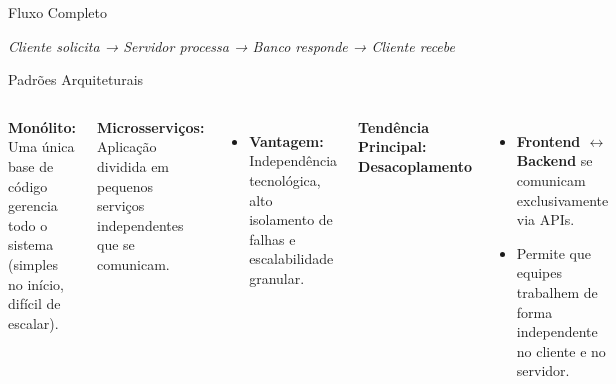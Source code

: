 \documentclass{beamer}
\begin{document}
\begin{frame}{Fluxo Completo}

\begin{center}


\end{center}

\vspace{0.2cm}
\textit{Cliente solicita → Servidor processa → Banco responde → Cliente recebe}

\end{frame}


\begin{frame}{Padrões Arquiteturais}
    \begin{columns}[t]
        \textbf{Monólito:} Uma única base de código gerencia todo o sistema (simples no início, difícil de escalar).
        
        \vspace{0.3cm}
        \textbf{Microsserviços:} Aplicação dividida em pequenos serviços independentes que se comunicam.
        \begin{itemize}
            \item \textbf{Vantagem:} Independência tecnológica, alto isolamento de falhas e escalabilidade granular.
        \end{itemize}

        \textbf{Tendência Principal: Desacoplamento}
        \begin{itemize}
            \item \textbf{Frontend $\leftrightarrow$ Backend} se comunicam exclusivamente via APIs.
            \item Permite que equipes trabalhem de forma independente no cliente e no servidor.
        \end{itemize}
    \end{columns}
\end{frame}
\end{document}
